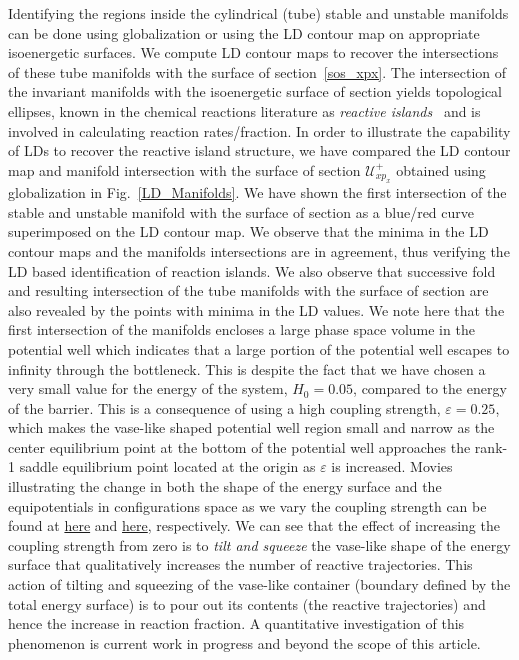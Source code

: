 \documentclass{ws-ijbc}
\begin{document}
Identifying the regions inside the cylindrical (tube) stable and unstable manifolds can be done using globalization or using the LD contour map on appropriate isoenergetic surfaces. We compute LD contour maps to recover the intersections of these tube manifolds with the surface of section~\ref{sos_xpx}. The intersection of the invariant manifolds with the isoenergetic surface of section yields topological ellipses, known in the chemical reactions literature as \textit{reactive islands}~\cite{deleon1991a,deleon1991b,deleon1992,patra2018detecting} and is involved in calculating reaction rates/fraction. In order to illustrate the capability of LDs to recover the reactive island structure, we have compared the LD contour map and manifold intersection with the surface of section $\mathcal{U}^{+}_{xp_x}$ obtained using globalization in Fig.~\ref{LD_Manifolds}. We have shown the first intersection of the stable and unstable manifold with the surface of section as a blue/red curve superimposed on the LD contour map. We observe that the minima in the LD contour maps and the manifolds intersections are in agreement, thus verifying the LD based identification of reaction islands. We also observe that successive fold and resulting intersection of the tube manifolds with the surface of section are also revealed by the points with minima in the LD values. We note here that the first intersection of the manifolds encloses a large phase space volume in the potential well which indicates that a large portion of the potential well escapes to infinity through the bottleneck. This is despite the fact that we have chosen a very small value for the energy of the system, $H_0 = 0.05$, compared to the energy of the barrier. This is a consequence of using a high coupling strength, $\varepsilon = 0.25$, which makes the vase-like shaped potential well region small and narrow as the center equilibrium point at the bottom of the potential well approaches the rank-1 saddle equilibrium point located at the origin as $\varepsilon$ is increased. Movies illustrating the change in both the shape of the energy surface and the equipotentials in configurations space as we vary the coupling strength can be found at \href{https://youtu.be/kYklCrSwtls}{here} and \href{https://youtu.be/0FNChWVM6nU}{here}, respectively. We can see that the effect of increasing the coupling strength from zero is to \textit{tilt and squeeze} the vase-like shape of the energy surface that qualitatively increases the number of reactive trajectories. This action of tilting and squeezing of the vase-like container (boundary defined by the total energy surface) is to pour out its contents (the reactive trajectories) and hence the increase in reaction fraction. A quantitative investigation of this phenomenon is current work in progress and beyond the scope of this article.
\end{document}
